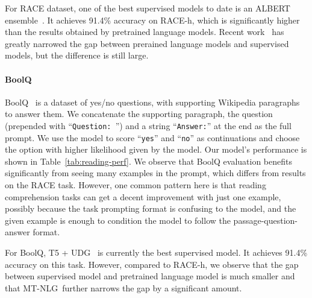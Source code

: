 \documentclass[11pt]{article}
\newcommand{\ours}{MT-NLG}
\begin{document}
For RACE dataset, one of the best supervised models to date is an ALBERT ensemble~\cite{Jiang2020ImprovingMR}. It achieves 91.4\% accuracy on RACE-h, which is significantly higher than the results obtained by pretrained language models. Recent work~\cite{Rae2021Gopher} has greatly narrowed the gap between prerained language models and supervised models, but the difference is still large.

\paragraph{BoolQ} BoolQ~\citep{clark-etal-2019-boolq} is a dataset of yes/no questions, with supporting Wikipedia paragraphs to answer them. We concatenate the supporting paragraph, the question (prepended with ``\texttt{Question: }'') and a string ``\texttt{Answer:}'' at the end as the full prompt. We use the model to score ``\texttt{yes}'' and ``\texttt{no}'' as continuations and choose the option with higher likelihood given by the model. Our model's performance is shown in Table~\ref{tab:reading-perf}. We observe that BoolQ evaluation benefits significantly from seeing many examples in the prompt, which differs from results on the RACE task. However, one common pattern here is that reading comprehension tasks can get a decent improvement with just one example, possibly because the task prompting format is confusing to the model, and the given example is enough to condition the model to follow the passage-question-answer format.

For BoolQ, T5 + UDG~\cite{Wang2021TowardsZL} is currently the best supervised model. It achieves 91.4\% accuracy on this task. However, compared to RACE-h, we observe that the gap between supervised model and pretrained language model is much smaller and that \ours~further narrows the gap by a significant amount.

\end{document}
